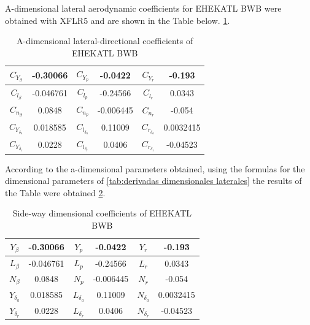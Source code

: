 A-dimensional lateral aerodynamic coefficients for EHEKATL BWB were obtained with XFLR5 and are shown in the Table below. \ref{Coeficientes adimensionales laterales de EHEKATL BWB}. 
\begin{table}[!h]
    \centering
    \begin{tabular}{|cc|cc|cc|}
    \hline
     $C_{Y_\beta}$ & -0.30066 & $C_{Y_p}$ & -0.0422 & $C_{Y_r}$ & -0.193 \\
     \hline
     $C_{l_\beta}$ & -0.046761 & $C_{l_p}$ & -0.24566 & $C_{l_r}$ & 0.0343 \\
     \hline
     $C_{n_\beta}$ & 0.0848 & $C_{n_p}$ & -0.006445 & $C_{n_r}$ & -0.054 \\
     \hline
     $C_{Y_{\delta_a}}$ & 0.018585 & $C_{l_{\delta_a}}$ & 0.11009 & $C_{r_{\delta_a}}$ & 0.0032415 \\
     \hline
     $C_{Y_{\delta_r}}$ & 0.0228 & $C_{l_{\delta_r}}$ & 0.0406 & $C_{r_{\delta_r}}$ & -0.04523 \\
     \hline
    \end{tabular}
    \caption{A-dimensional lateral-directional coefficients of EHEKATL BWB}
    \label{Coeficientes adimensionales laterales de EHEKATL BWB}
\end{table}

According to the a-dimensional parameters obtained, using the formulas for the dimensional parameters of \ref{tab:derivadas dimensionales laterales} the results of the Table were obtained \ref{Coeficientes dimensionales laterales de EHEKATL BWB}.

\begin{table}[!h]
    \centering
    \begin{tabular}{|cc|cc|cc|}
    \hline
     ${Y_\beta}$ & -0.30066 & ${Y_p}$ & -0.0422 & ${Y_r}$ & -0.193 \\
     \hline
     ${L_\beta}$ & -0.046761 & ${L_p}$ & -0.24566 & ${L_r}$ & 0.0343 \\
     \hline
     ${N_\beta}$ & 0.0848 & ${N_p}$ & -0.006445 & ${N_r}$ & -0.054 \\
     \hline
     ${Y_{\delta_a}}$ & 0.018585 & ${L_{\delta_a}}$ & 0.11009 & ${N_{\delta_a}}$ & 0.0032415 \\
     \hline
     ${Y_{\delta_r}}$ & 0.0228 & ${L_{\delta_r}}$ & 0.0406 & ${N_{\delta_r}}$ & -0.04523 \\
     \hline
    \end{tabular}
    \caption{Side-way dimensional coefficients of EHEKATL BWB}
    \label{Coeficientes dimensionales laterales de EHEKATL BWB}
\end{table}

